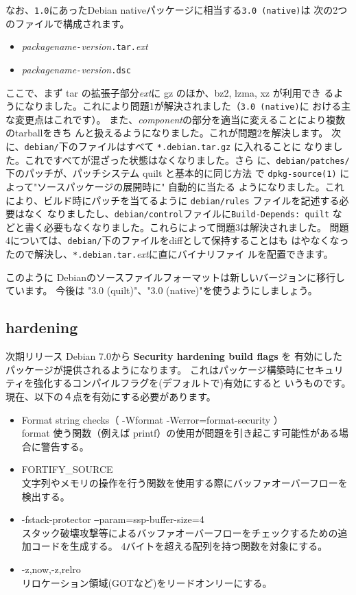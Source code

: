 \documentclass[mingoth,a4paper]{jsarticle}
\begin{document}
なお、\verb|1.0|にあったDebian nativeパッケージに相当する\verb|3.0 (native)|は
次の2つのファイルで構成されます。
\begin{itemize}
 \item \textit{packagename}\verb|-|\textit{version}\verb|.tar.|\textit{ext}
 \item \textit{packagename}\verb|-|\textit{version}\verb|.dsc|
\end{itemize}

ここで、まず tar の拡張子部分\textit{ext}に gz のほか、bz2, lzma, xz が利用でき
るようになりました。これにより問題1が解決されました（\verb|3.0 (native)|に
おける主な変更点はこれです）。
また、\textit{component}の部分を適当に変えることにより複数のtarballをきち
んと扱えるようになりました。これが問題2を解決します。
次に、\verb|debian/|下のファイルはすべて \verb|*.debian.tar.gz| に入れることに
なりました。これですべてが混ざった状態はなくなりました。さら
に、\verb|debian/patches/| 下のパッチが、パッチシステム quilt と基本的に同じ方法
で \verb|dpkg-source(1)| によって"ソースパッケージの展開時に" 自動的に当たる
ようになりました。これにより、ビルド時にパッチを当てるように \verb|debian/rules| ファイルを記述する必要はなく
なりましたし、\verb|debian/control|ファイルに\verb|Build-Depends: quilt|
などと書く必要もなくなりました。これらによって問題3は解決されました。
問題4については、\verb|debian/|下のファイルをdiffとして保持することはも
はやなくなったので解決し、\verb|*.debian.tar.|\textit{ext}に直にバイナリファイ
ルを配置できます。

このように Debianのソースファイルフォーマットは新しいバージョンに移行しています。
今後は "3.0 (quilt)"、"3.0 (native)"を使うようにしましょう。

\subsection{hardening}
次期リリース Debian 7.0から {\bf Security hardening build flags} を
有効にしたパッケージが提供されるようになります。
これはパッケージ構築時にセキュリティを強化するコンパイルフラグを(デフォルトで)有効にすると
いうものです。現在、以下の４点を有効にする必要があります。

\begin{itemize}
  \item Format string checks（ -Wformat -Werror=format-security ）\\
  format 使う関数（例えば printf）の使用が問題を引き起こす可能性がある場合に警告する。
  \item FORTIFY\_SOURCE \\
  文字列やメモリの操作を行う関数を使用する際にバッファオーバーフローを検出する。
  \item -fstack-protector \texttt{--}param=ssp-buffer-size=4 \\
  スタック破壊攻撃等によるバッファオーバーフローをチェックするための追加コードを生成する。
  4バイトを超える配列を持つ関数を対象にする。
  \item -z,now,-z,relro \\
  リロケーション領域(GOTなど)をリードオンリーにする。
\end{itemize}
\end{document}
